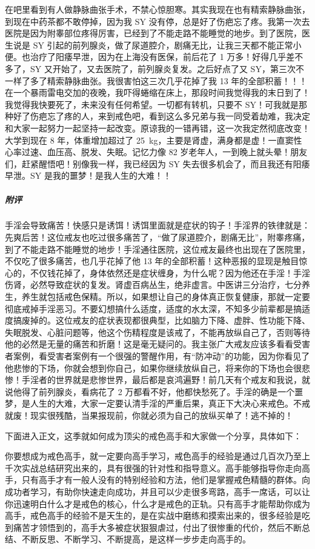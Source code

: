 \begin{case}
    在吧里看到有人做静脉曲张手术，不禁心惊胆寒。其实我现在也有精索静脉曲张，到现在中药茶都不敢停掉，因为我 SY 没有停，总是好了伤疤忘了疼。我第一次去医院是因为附睾部位疼得厉害，已经到了不能走路不能睡觉的地步。到了医院，医生说是 SY 引起的前列腺炎，做了尿道腔介，剧痛无比，让我三天都不能正常小便。也治疗了阳痿早泄，因为在上海没有医保，前后花了 1 万多！好得几乎差不多了，SY 又开始了，又去医院了，前列腺炎复发。之后好点了又 SY，第三次不一样了多了精索静脉曲张。我很害怕这三次几乎花掉了我 13 年的全部积蓄！！！在一个暴雨雷电交加的夜晚，我吓得蜷缩在床上，那段时间我觉得我的末日到了！我觉得我快要死了，未来没有任何希望。一切都有转机，只要不 SY！可我就是那种好了伤疤忘了疼的人，来到戒色吧，看到这么多兄弟与我一同受着劫难，我决定和大家一起努力一起坚持一起改变。原谅我的一错再错，这一次我定然彻底改变！大学到现在 8 年，体重增加超过了 \SI{25}{\kilo\gram}，主要是肾虚，满身都是虚！一直窦性心率过速、血压高、脱发、失眠。记忆力像 82 岁老年人，一到晚上就头晕！朋友们，赶紧醒悟吧！别像我一样，我已经因为 SY 失去很多机会了，而且我还有阳痿早泄。SY 是我的噩梦！是我人生的大难！！
    \subparagraph{附评} 手淫会导致痛苦！快感只是诱饵！诱饵里面就是症状的钩子！手淫界的铁律就是：先爽后苦！这位戒友也吃过很多痛苦了，“做了尿道腔介，剧痛无比”，附睾疼痛，到了不能走路不能睡觉的地步！手淫通往医院，这位戒友最终也出现在了医院里，不仅吃了很多痛苦，也几乎花掉了他 13 年的全部积蓄！这种恶报的显现是触目惊心的，不仅钱花掉了，身体依然还是症状缠身，为什么呢？因为他还在手淫！手淫伤肾，必然导致症状的复发。肾虚百病丛生，绝非虚言。中医讲三分治疗，七分养生，养生就包括戒色保精。所以，如果想让自己的身体真正恢复健康，那就一定要彻底戒掉手淫恶习。不要幻想搞什么适度，适度的水太深，不知多少前辈都是搞适度搞废掉的。这位戒友的症状表现都很典型，比如脑力下降、虚胖、性功能下降、失眠脱发、心脏问题等，他这个伤精程度是该戒了，不能再放纵自己了，否则等待他的必然是无量的痛苦和折磨！这是毫无疑问的。我主张广大戒友应该多看看受害者案例，看受害者案例有一个很强的警醒作用，有“防冲动”的功能，因为你看见了他悲惨的下场，你就会想到你自己，如果你继续放纵自己，将来你的下场也会很悲惨！手淫者的世界就是悲惨世界，最后都是哀鸿遍野！前几天有个戒友和我说，就说他得了前列腺炎，看病花了 2 万都看不好，他都快愁死了。手淫的确是一个噩梦，是人生的大难，大家一定要认清手淫的严重后果，真正下大决心来戒色。不戒就废！现实很残酷，当果报现前，你就必须为自己的放纵买单了！逃不掉的！
\end{case}

下面进入正文，这季就如何成为顶尖的戒色高手和大家做一个分享，具体如下：

你要想成为戒色高手，就一定要向高手学习，戒色高手的经验是通过几百次乃至上千次实战总结研究出来的，具有很强的针对性和指导意义。高手能够指导你走向高手，只有高手才有一般人没有的特别经验和方法，他们是掌握戒色精髓的群体。向成功者学习，有助你快速走向成功，并且可以少走很多弯路，高手一席话，可以让你迅速明白什么才是戒色的核心，什么才是戒色的正轨。只有高手才能帮助你成为高手，戒色高手的经验不是天生的，是在实战中磨练和摸索出来的，很多经验是吃到痛苦才领悟到的，高手大多被症状狠狠虐过，付出了很惨重的代价，然后不断总结、不断反思、不断学习、不断提高，是这样一步步走向高手的。

